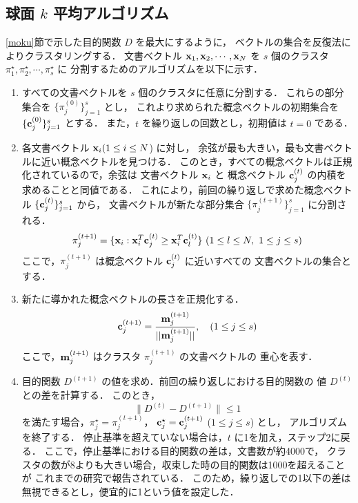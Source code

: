 \subsection{球面 $k$ 平均アルゴリズム}
\ref{moku}節で示した目的関数 $D$ を最大にするように，
ベクトルの集合を反復法によりクラスタリングする．
文書ベクトル ${\bf x}_1, {\bf x}_2, \cdots , {\bf x}_N$ を 
$s$ 個のクラスタ $\pi_1^{\star}, \pi_2^{\star}, \cdots , \pi_s^{\star}$ に
分割するためのアルゴリズムを以下に示す．
\begin{enumerate}
\item すべての文書ベクトルを $s$ 個のクラスタに任意に分割する．
これらの部分集合を $\{ \pi_j^{(0)} \}_{j = 1}^{s}$ とし，
これより求められた概念ベクトルの初期集合を 
$\{ {\bf c}_j^{(0)} \}_{j = 1}^{s}$ とする．
また，$t$ を繰り返しの回数とし，初期値は $t = 0$ である．

\item 各文書ベクトル ${\bf x}_i (1 \leq i \leq N$) に対し，
余弦が最も大きい，最も文書ベクトルに近い概念ベクトルを見つける．
このとき，すべての概念ベクトルは正規化されているので，余弦は
文書ベクトル ${\bf x}_i$ と 概念ベクトル ${\bf c}_j^{(t)}$ の内積を
求めることと同値である．
これにより，前回の繰り返しで求めた概念ベクトル 
$\{ {\bf c}_j^{(t)} \}_{j = 1}^{s}$ から，
文書ベクトルが新たな部分集合 $\{ \pi_j^{(t+1)} \}_{j = 1}^{s}$ に分割される．
\begin{equation}
\pi_j^{(t+1)} = \{ {\bf x}_i: 
{\bf x}_i^T {\bf c}_j^{(t)} \geq {\bf x}_i^T {\bf c}_l^{(t)}\} \ 
(1 \leq l \leq N,\  1 \leq j \leq s)
\end{equation}
ここで，$\pi_j^{(t+1)}$ は概念ベクトル ${\bf c}_j^{(t)}$ に近いすべての
文書ベクトルの集合とする．

\item 新たに導かれた概念ベクトルの長さを正規化する．
\begin{equation}
{\bf c}_j^{(t+1)} = \frac{{\bf m}_j^{(t+1)}}{|| {\bf m}_j^{(t+1)} ||}, 
\ \ \ (1 \leq j \leq s)
\end{equation}
ここで，${\bf m}_j^{(t+1)}$ はクラスタ $\pi_j^{(t+1)}$ の文書ベクトルの
重心を表す．

\item 目的関数 $D^{(t+1)}$ の値を求め．前回の繰り返しにおける目的関数の
値 $D^{(t)}$ との差を計算する．
このとき，
\begin{equation}
\| D^{(t)} - D^{(t+1)} \| \leq 1
\end{equation}
を満たす場合，$\pi_j^{\star} = \pi_j^{(t+1)}$，
${\bf c}_j^{\star} = {\bf c}_j^{(t+1)}$ ($1 \leq j \leq s$) とし，
アルゴリズムを終了する．
停止基準を超えていない場合は，$t$ に1を加え，ステップ2に戻る．
ここで，停止基準における目的関数の差は，文書数が約4000で，
クラスタの数が8よりも大きい場合，収束した時の目的関数は1000を超えることが
これまでの研究で報告されている\cite{Dhillon}．
このため，繰り返しでの1以下の差は無視できるとし，便宜的に1という値を設定した．
\end{enumerate}


